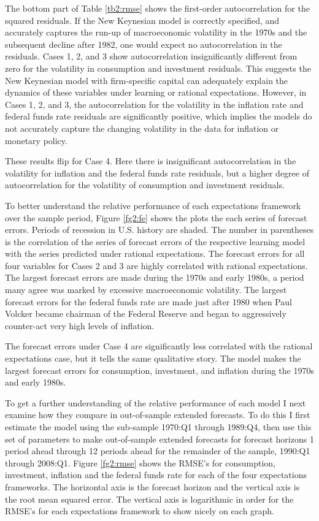 {The bottom part of Table \ref{tb2:rmse} shows the first-order autocorrelation for the squared residuals.  If the New Keynesian model is correctly specified, and accurately captures the run-up of macroeconomic volatility in the 1970s and the subsequent decline after 1982, one would expect no autocorrelation in the residuals.  Cases 1, 2, and 3 show autocorrelation insignificantly different from zero for the volatility in consumption and investment residuals.  This suggests the New Keynesian model with firm-specific capital can adequately explain the dynamics of these variables under learning or rational expectations.  However, in Cases 1, 2, and 3, the autocorrelation for the volatility in the inflation rate and federal funds rate residuals are significantly positive, which implies the models do not accurately capture the changing volatility in the data for inflation or monetary policy.  

These results flip for Case 4.  Here there is insignificant autocorrelation in the volatility for inflation and the federal funds rate residuals, but a higher degree of autocorrelation for the volatility of consumption and investment residuals.  

To better understand the relative performance of each expectations framework over the sample period, Figure \ref{fg2:fe} shows the plots the each series of forecast errors.  Periods of recession in U.S. history are shaded.  The number in parentheses is the correlation of the series of forecast errors of the respective learning model with the series predicted under rational expectations.  The forecast errors for all four variables for Cases 2 and 3 are highly correlated with rational expectations.  The largest forecast errors are made during the 1970s and early 1980s, a period many agree was marked by excessive macroeconomic volatility.  The largest forecast errors for the federal funds rate are made just after 1980 when Paul Volcker became chairman of the Federal Reserve and began to aggressively counter-act very high levels of inflation.

 The forecast errors under Case 4 are significantly less correlated with the rational expectations case, but it tells the same qualitative story.  The model makes the largest forecast errors for consumption, investment, and inflation during the 1970s and early 1980s.

To get a further understanding of the relative performance of each model I next examine how they compare in out-of-sample extended forecasts.  To do this I first estimate the model using the sub-sample 1970:Q1 through 1989:Q4, then use this set of parameters to make out-of-sample extended forecasts for forecast horizons 1 period ahead through 12 periods ahead for the remainder of the sample, 1990:Q1 through 2008:Q1.  Figure \ref{fg2:rmse} shows the RMSE's for consumption, investment, inflation and the federal funds rate for each of the four expectations frameworks.  The horizontal axis is the forecast horizon and the vertical axis is the root mean squared error.  The vertical axis is logarithmic in order for the RMSE's for each expectations framework to show nicely on each graph.

}
